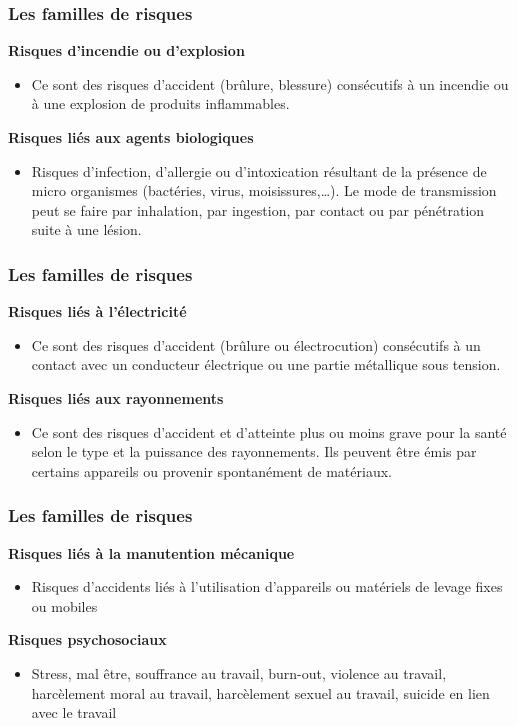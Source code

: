 \documentclass{beamer}
\begin{document}
\begin{frame}
\frametitle{Les familles de risques}

\textbf{Risques d’incendie ou d’explosion}
\begin{itemize}
\item Ce sont des risques d’accident (brûlure, blessure) consécutifs à un incendie ou à une explosion de produits inflammables.
\end{itemize}
\textbf{Risques liés aux agents biologiques}
\begin{itemize}
\item Risques d’infection, d’allergie ou d’intoxication résultant de la présence de micro organismes (bactéries, virus, moisissures,…). Le mode de transmission peut se faire par inhalation, par ingestion, par contact ou par pénétration suite à une lésion.
\end{itemize}
\end{frame}

\begin{frame}
\frametitle{Les familles de risques}

\textbf{Risques liés à l’électricité}
\begin{itemize}
\item Ce sont des risques d’accident (brûlure ou électrocution) consécutifs à un contact avec un conducteur électrique ou une partie métallique sous tension.
\end{itemize}
\textbf{Risques liés aux rayonnements}
\begin{itemize}
\item Ce sont des risques d’accident et d’atteinte plus ou moins grave pour la santé selon le type et la puissance des rayonnements. Ils peuvent être émis par certains appareils ou provenir spontanément de matériaux.
\end{itemize}
\end{frame}

\begin{frame}
\frametitle{Les familles de risques}

\textbf{Risques liés à la manutention mécanique}
\begin{itemize}
\item Risques d’accidents liés à l’utilisation d’appareils ou matériels de levage fixes ou mobiles
\end{itemize}
\textbf{Risques psychosociaux}
\begin{itemize}
\item Stress, mal être, souffrance au travail, burn-out, violence au travail, harcèlement moral au travail, harcèlement sexuel au travail, suicide en lien avec le travail
\end{itemize}
\end{frame}
\end{document}
